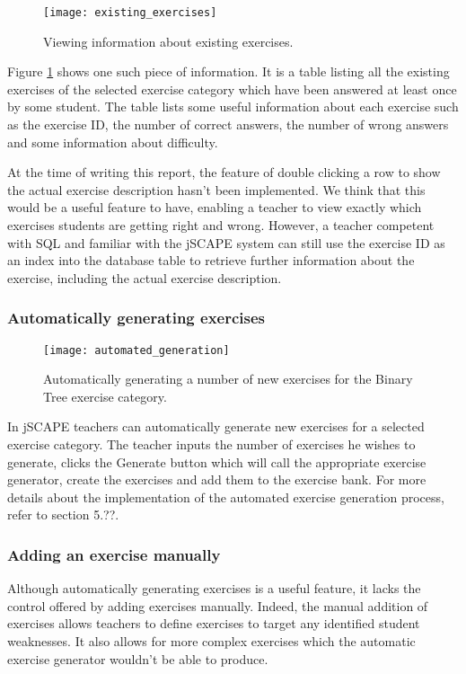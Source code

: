 \begin{figure}[H]
\centering
\texttt{[image: existing\_exercises]}
\caption{Viewing information about existing exercises.}
\label{fig:existing_exercises}
\end{figure}

Figure \ref{fig:existing_exercises} shows one such piece of information. It is a table listing all the existing exercises of the selected exercise category which have been answered at least once by some student. The table lists some useful information about each exercise such as the exercise ID, the number of correct answers, the number of wrong answers and some information about difficulty.\newline

At the time of writing this report, the feature of double clicking a row to show the actual exercise description hasn't been implemented. We think that this would be a useful feature to have, enabling a teacher to view exactly which exercises students are getting right and wrong. However, a teacher competent with SQL and familiar with the jSCAPE system can still use the exercise ID as an index into the database table to retrieve further information about the exercise, including the actual exercise description.

\subsubsection{Automatically generating exercises}
\begin{figure}[H]
\centering
\texttt{[image: automated\_generation]}
\caption{Automatically generating a number of new exercises for the Binary Tree exercise category.}
\label{fig:automated_generation}
\end{figure}

In jSCAPE teachers can automatically generate new exercises for a selected exercise category. The teacher inputs the number of exercises he wishes to generate, clicks the Generate button which will call the appropriate exercise generator, create the exercises and add them to the exercise bank. For more details about the implementation of the automated exercise generation process, refer to section 5.??.

\subsubsection{Adding an exercise manually}
Although automatically generating exercises is a useful feature, it lacks the control offered by adding exercises manually. Indeed, the manual addition of exercises allows teachers to define exercises to target any identified student weaknesses. It also allows for more complex exercises which the automatic exercise generator wouldn't be able to produce.

